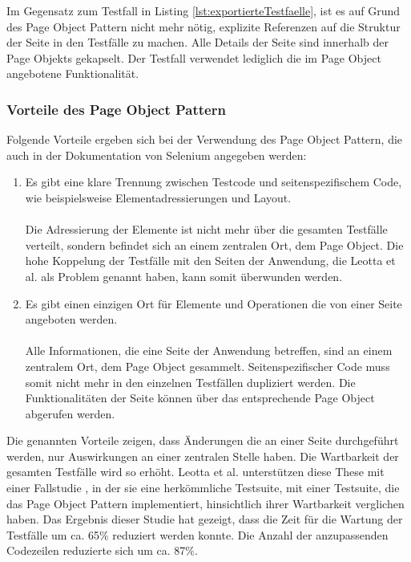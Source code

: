 Im Gegensatz zum Testfall in Listing \ref{lst:exportierteTestfaelle}, ist es auf Grund des Page Object Pattern nicht mehr nötig, explizite Referenzen auf die Struktur der Seite in den Testfälle zu machen. Alle Details der Seite sind innerhalb der Page Objekts gekapselt. Der Testfall verwendet lediglich die im Page Object angebotene Funktionalität.


\subsubsection{Vorteile des Page Object Pattern}
\label{sec:vorteile_des_page_object_pattern}

Folgende Vorteile ergeben sich bei der Verwendung des Page Object Pattern, die auch in der Dokumentation von Selenium \cite{selenium_selenium_2015-2} angegeben werden:

\begin{enumerate}
\item Es gibt eine klare Trennung zwischen Testcode und seitenspezifischem Code, wie beispielsweise Elementadressierungen und Layout. \\ \\
Die Adressierung der Elemente ist nicht mehr über die gesamten Testfälle verteilt, sondern befindet sich an einem zentralen Ort, dem Page Object.
Die hohe Koppelung der Testfälle mit den Seiten der Anwendung, die Leotta et al. \cite{leotta_repairing_2013} als Problem genannt haben, kann somit überwunden werden.

\item Es gibt einen einzigen Ort für Elemente und Operationen die von einer Seite angeboten werden. \\ \\
Alle Informationen, die eine Seite der Anwendung betreffen, sind an einem zentralem Ort, dem Page Object gesammelt. Seitenspezifischer Code muss somit nicht mehr in den einzelnen Testfällen dupliziert werden. Die Funktionalitäten der Seite können über das entsprechende Page Object abgerufen werden.

\end{enumerate}

Die genannten Vorteile zeigen, dass Änderungen die an einer Seite durchgeführt werden, nur Auswirkungen an einer zentralen Stelle haben. Die Wartbarkeit der gesamten Testfälle wird so erhöht.
Leotta et al. unterstützen diese These mit einer Fallstudie \cite{leotta_repairing_2013}, in der sie eine herkömmliche Testsuite, mit einer Testsuite, die das Page Object Pattern implementiert, hinsichtlich ihrer Wartbarkeit verglichen haben.
Das Ergebnis dieser Studie hat gezeigt, dass die Zeit für die Wartung der Testfälle um ca. 65\% reduziert werden konnte. Die Anzahl der anzupassenden Codezeilen reduzierte sich um ca. 87\%.

